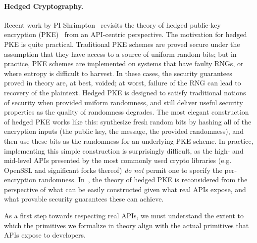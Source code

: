 \begin{task}
\end{task}
%

\paragraph{Hedged Cryptography. }
Recent work by PI Shrimpton~\cite{BPS} revisits the theory of
hedged public-key encryption (PKE)~\cite{BBN+} from an API-centric perspective.
%
The motivation for hedged PKE is quite practical. Traditional
PKE schemes are proved secure under the assumption that they have access to a
source of uniform random bits; but in practice, PKE schemes are implemented on
systems that have faulty RNGs, or where entropy is difficult to harvest.  In
these cases, the security guarantees proved in theory are, at best, voided; at
worst, failure of the RNG can lead to recovery of the plaintext.
%
Hedged PKE is designed to satisfy traditional notions of security when provided
uniform randomness, and still deliver useful security properties as the quality
of randomness degrades.  The most elegant construction of hedged PKE works like
this: synthesize fresh random bits by hashing all of the encryption inputs (the
public key, the message, the provided randomness), and then use these bits as
the randomness for an underlying PKE scheme.  In practice, implementing this
simple construction is surprisingly difficult, as the high- and mid-level APIs
presented by the most commonly used crypto libraries (e.g. OpenSSL and
significant forks thereof) \emph{do not} permit one to specify the
per-encryption randomness.   In~\cite{BPS}, the theory of hedged PKE is
reconsidered from the perspective of what can be easily constructed given what
real APIs expose, and what provable security guarantees these can achieve.

\begin{task}
\end{task}

\begin{task}
 As a first step towards respecting real APIs, we must understand the extent to
which the primitives we formalize in theory align with the actual primitives
that APIs expose to developers. 
\end{task}

